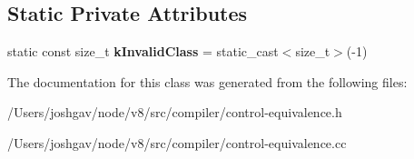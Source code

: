 \subsection*{Static Private Attributes}
\begin{DoxyCompactItemize}
\item 
static const size\+\_\+t {\bfseries k\+Invalid\+Class} = static\+\_\+cast$<$size\+\_\+t$>$(-\/1)\hypertarget{classv8_1_1internal_1_1compiler_1_1_control_equivalence_aad54f059377aa4faa76feef11772fb82}{}\label{classv8_1_1internal_1_1compiler_1_1_control_equivalence_aad54f059377aa4faa76feef11772fb82}

\end{DoxyCompactItemize}


The documentation for this class was generated from the following files\+:\begin{DoxyCompactItemize}
\item 
/\+Users/joshgav/node/v8/src/compiler/control-\/equivalence.\+h\item 
/\+Users/joshgav/node/v8/src/compiler/control-\/equivalence.\+cc\end{DoxyCompactItemize}
